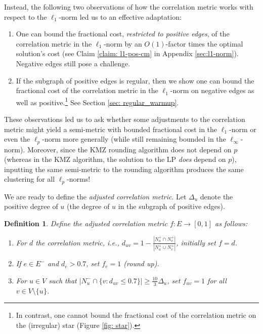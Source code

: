 \documentclass[11pt]{article}
\newtheorem{definition}{Definition}
\begin{document}
Instead, the following two observations of how the correlation metric works with respect to the $\ell_1$-norm led us to an effective adaptation: 
\begin{enumerate}
\item One can bound the fractional cost, \textit{restricted to positive edges}, of the correlation metric in the $\ell_1$-norm  by an $O(1)$-factor times the optimal solution's cost (see Claim \ref{claim: l1-pos-cm} in Appendix \ref{sec:l1-norm}). Negative edges still pose a challenge.
\item If the subgraph of positive edges is regular, then we show one can bound the fractional cost of the correlation metric in the $\ell_1$-norm on negative edges as well as positive.\footnote{In contrast, one cannot bound the fractional cost of the correlation metric on the (irregular) star (Figure \ref{fig: star}).} See Section \ref{sec: regular_warmup}. 
\end{enumerate}


These observations led us to ask whether some adjustments to the correlation metric might yield a semi-metric with bounded fractional cost in the $\ell_1$-norm or even the $\ell_p$-norm more generally (while still remaining bounded in the $\ell_{\infty}$-norm). Moreover, since the KMZ rounding algorithm does not depend on $p$ (whereas in the KMZ algorithm, the solution to the LP \textit{does} depend on $p$), inputting the same semi-metric to the rounding algorithm produces the same clustering for all $\ell_p$-norms! 

We are ready to define the \emph{adjusted correlation metric}. 
Let $\Delta_u$ denote the positive degree of $u$ (the degree of $u$ in the subgraph of positive edges).
\begin{definition} \label{def: adj_corr_metric}
    Define the \emph{adjusted correlation metric} $f: E \rightarrow [0,1]$ as follows:
    \begin{enumerate}
        \item For $d$ the correlation metric, i.e., 
        $d_{uv} = 1 - \frac{|N_u^+ \cap N_v^+|}{|N_u^+ \cup N_v^+|}$, initially set $f = d$. 
        \item If $e \in E^-$ and $d_e > 0.7$, set $f_e = 1$ (round up). 
        \item For $u \in V$ such that $|N_u^- \cap \{v: d_{uv} \leq 0.7\}| \geq \frac{10}{3}\Delta_u $, set $f_{uv}=1$ for all $v \in V \setminus \{u\}$.
    \end{enumerate}
\end{definition}
\end{document}
